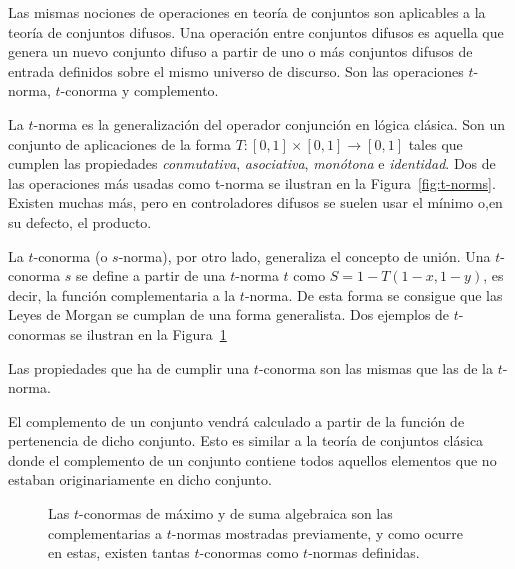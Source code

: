 Las mismas nociones de operaciones en teoría de conjuntos son aplicables a la teoría de conjuntos difusos. Una operación entre conjuntos difusos es aquella que genera un nuevo conjunto difuso a partir de uno o más conjuntos difusos de entrada definidos sobre el mismo universo de discurso. Son las operaciones $t$-norma, $t$-conorma y complemento.

La $t$-norma es la generalización del operador conjunción en lógica clásica. Son un conjunto de aplicaciones de la forma $T: [0, 1] \times [0, 1] \rightarrow [0, 1]$ tales que cumplen las propiedades \textit{conmutativa}, \textit{asociativa}, \textit{monótona} e \textit{identidad}. Dos de las operaciones más usadas como t-norma se ilustran en la Figura~\ref{fig:t-norms}. Existen muchas más, pero en controladores difusos se suelen usar el mínimo o,en su defecto, el producto.

La $t$-conorma (o $s$-norma), por otro lado, generaliza el concepto de unión. Una $t$-conorma $s$ se define a partir de una $t$-norma $t$ como $S = 1 - T(1-x, 1-y)$, es decir, la función complementaria a la $t$-norma. De esta forma se consigue que las Leyes de Morgan se cumplan de una forma generalista. Dos ejemplos de $t$-conormas se ilustran en la Figura~\ref{fig:t-conorms}

Las propiedades que ha de cumplir una $t$-conorma son las mismas que las de la $t$-norma.

El complemento de un conjunto vendrá calculado a partir de la función de pertenencia de dicho conjunto. Esto es similar a la teoría de conjuntos clásica donde el complemento de un conjunto contiene todos aquellos elementos que no estaban originariamente en dicho conjunto.

\begin{figure}[t]
	\centering
	\caption[$t$-normas del máximo y de la suma algebraica.]{Las $t$-conormas de máximo y de suma algebraica son las complementarias a $t$-normas mostradas previamente, y como ocurre en estas, existen tantas $t$-conormas como $t$-normas definidas.}
	\label{fig:t-conorms}
\end{figure}

